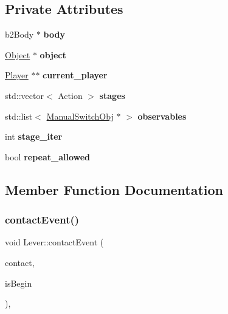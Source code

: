 \subsection*{Private Attributes}
\begin{DoxyCompactItemize}
\item 
\mbox{\label{class_lever_aa063d5dab7eefeee48b93c0ea694bb42}} 
b2\+Body $\ast$ {\bfseries body}
\item 
\mbox{\label{class_lever_aee2d6a9e2fc7ff31a9d8eea2f98b7e32}} 
\hyperlink{class_object}{Object} $\ast$ {\bfseries object}
\item 
\mbox{\label{class_lever_ac710b732ab842d55f84488f9d88e325b}} 
\hyperlink{class_player}{Player} $\ast$$\ast$ {\bfseries current\+\_\+player}
\item 
\mbox{\label{class_lever_a8352c41d4452bf72a3f7d4dded03598c}} 
std\+::vector$<$ Action $>$ {\bfseries stages}
\item 
\mbox{\label{class_lever_ae7161c7fb8bc611f7d4cc3525d406e81}} 
std\+::list$<$ \hyperlink{class_manual_switch_obj}{Manual\+Switch\+Obj} $\ast$ $>$ {\bfseries observables}
\item 
\mbox{\label{class_lever_a0a44f2d62a5ebc3bb5ae4aaed55076fb}} 
int {\bfseries stage\+\_\+iter}
\item 
\mbox{\label{class_lever_a8c464b1b28d5978e48bc3bc85a8cb67d}} 
bool {\bfseries repeat\+\_\+allowed}
\end{DoxyCompactItemize}


\subsection{Member Function Documentation}
\mbox{\label{class_lever_a9ec153b4c960d0a187539cc8f07e5bd9}} 
\subsubsection{\texorpdfstring{contact\+Event()}{contactEvent()}}
{\footnotesize\ttfamily void Lever\+::contact\+Event (\begin{DoxyParamCaption}\item[{b2\+Contact $\ast$}]{contact,  }\item[{bool}]{is\+Begin }\end{DoxyParamCaption})\hspace{0.3cm}{\ttfamily [private]}, {\ttfamily [virtual]}}



